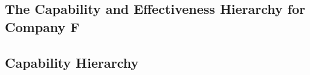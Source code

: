 \begin{appendices}

\chapter{The Capability and Effectiveness Hierarchy for Company F}

\section{Capability Hierarchy} \label{sec:capability_hierarchy}

\newcommand*\addition{\item[\FiveStar]}


\end{appendices}
